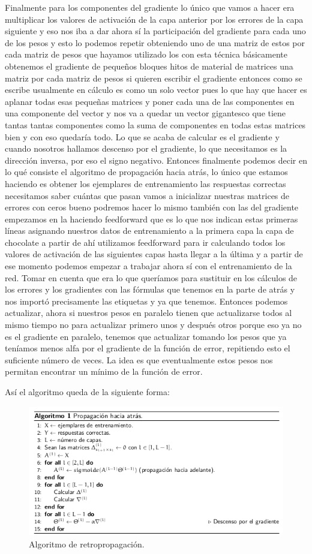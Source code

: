Finalmente para los componentes del gradiente  lo único que vamos a hacer era multiplicar los valores de activación de la capa anterior por los errores de la capa siguiente y eso nos iba a dar ahora sí la participación del gradiente para cada uno de los pesos y esto lo podemos repetir obteniendo uno de una matriz de estos por cada matriz de pesos que hayamos utilizado los con esta técnica básicamente obtenemos el gradiente de pequeños bloques hitos de material de matrices una matriz por cada matriz de pesos si quieren escribir el gradiente entonces como se escribe usualmente en cálculo es como un solo vector pues lo que hay que hacer es aplanar todas esas pequeñas matrices y poner cada una de las componentes en una componente del vector y nos va a quedar un vector gigantesco que tiene tantas tantas componentes como la suma de componentes en todas estas matrices bien y con eso quedaría todo. 
Lo que  se acaba de calcular es el gradiente y cuando nosotros hallamos descenso por el gradiente, lo que necesitamos es la dirección inversa, por eso el signo negativo. Entonces finalmente podemos decir en lo qué consiste el algoritmo de propagación hacia atrás, lo único que estamos haciendo es obtener los ejemplares de entrenamiento las respuestas correctas necesitamos saber cuántas que pasan vamos a inicializar nuestras matrices de errores con ceros bueno podremos hacer lo mismo también con las del gradiente empezamos en la haciendo feedforward que es lo que nos indican estas primeras líneas asignando nuestros datos de entrenamiento a la primera capa la capa de chocolate a partir de ahí utilizamos feedforward para ir calculando todos los valores de activación de las siguientes capas hasta llegar a la última y a partir de ese momento podemos empezar a trabajar ahora sí con el entrenamiento de la red. Tomar en cuenta que era lo que queríamos para sustituir en los cálculos de los errores y los gradientes con las fórmulas que tenemos en la parte de atrás y nos importó precisamente las etiquetas y ya que tenemos. Entonces podemos actualizar, ahora si nuestros pesos en paralelo tienen que actualizarse todos al mismo tiempo no para actualizar primero unos y después otros porque eso ya no es el gradiente en paralelo, tenemos que actualizar tomando los pesos que ya teníamos menos alfa por el gradiente de la función de error, repitiendo esto el suficiente número de veces. La idea es que eventualmente estos pesos nos permitan encontrar un mínimo de la función de error.

Así el algoritmo queda de la siguiente forma:
\begin{figure}[H]
 \centering
 \includegraphics[scale=0.8]{../Figuras/Algoritmo1.png}
 \caption{Algoritmo de retropropagación.}
 \label{fig:algoritmo}
\end{figure}

